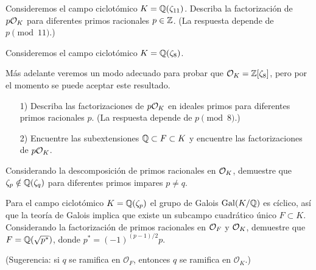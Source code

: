 \begin{ejercicio}
  Consideremos el campo ciclotómico $K = \mathbb{Q} (\zeta_{11})$.
  Describa la factorización de $p \mathcal{O}_K$ para diferentes primos racionales
  $p \in \mathbb{Z}$. (La respuesta depende de $p \pmod{11}$.)
\end{ejercicio}

\begin{ejercicio}
  Consideremos el campo ciclotómico $K = \mathbb{Q} (\zeta_8)$.

  Más adelante veremos un modo adecuado para probar que
  $\mathcal{O}_K = \mathbb{Z}[\zeta_8]$, pero por el momento se puede aceptar este resultado.

  \begin{enumerate}
  \item[1)] Describa las factorizaciones de $p \mathcal{O}_K$ en ideales primos para
    diferentes primos racionales $p$.  (La respuesta depende de $p \pmod{8}$.)

  \item[2)] Encuentre las subextensiones $\mathbb{Q} \subset F \subset K$ y encuentre
    las factorizaciones de $p \mathcal{O}_K$.
  \end{enumerate}
\end{ejercicio}

\begin{ejercicio}
  Considerando la descomposición de primos racionales en $\mathcal{O}_K$, demuestre que
  $\zeta_p \notin \mathbb{Q} (\zeta_q)$ para diferentes primos impares $p \ne q$.
\end{ejercicio}

\begin{ejercicio}
  \label{ejerc:subcampo-cuadratico-en-ciclotomico}
  Para el campo ciclotómico $K = \mathbb{Q} (\zeta_p)$ el grupo de Galois
  $\operatorname{Gal} (K/\mathbb{Q})$ es cíclico, así que la teoría de Galois implica que
  existe un subcampo cuadrático único $F \subset K$.
  Considerando la factorización de primos racionales en $\mathcal{O}_F$ y $\mathcal{O}_K$,
  demuestre que $F = \mathbb{Q} (\sqrt{p^*})$, donde $p^* = (-1)^{(p-1)/2} p$.

  \noindent (Sugerencia: si $q$ se ramifica en $\mathcal{O}_F$, entonces $q$ se
  ramifica en $\mathcal{O}_K$.)
\end{ejercicio}
